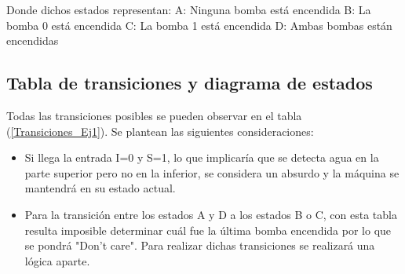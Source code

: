  Donde dichos estados representan:\newline 
 A: Ninguna bomba está encendida \newline
 B: La bomba 0 está encendida \newline
 C: La bomba 1 está encendida \newline
 D: Ambas bombas están encendidas \newline
 \par
 
\subsection{Tabla de transiciones y diagrama de estados}

Todas las transiciones posibles se pueden observar en el tabla (\ref{Transiciones_Ej1}). Se plantean las siguientes consideraciones:

\begin{itemize}
	\item Si llega la entrada I=0 y S=1, lo que implicaría que se detecta agua en la parte superior pero no en la inferior, se considera un absurdo y la máquina se mantendrá en su estado actual.
	\item Para la transición entre los estados A y D a los estados B o C, con esta tabla resulta imposible determinar cuál fue la última bomba encendida por lo que se pondrá "Don't care". Para realizar dichas transiciones se realizará una lógica aparte.

\end{itemize}

